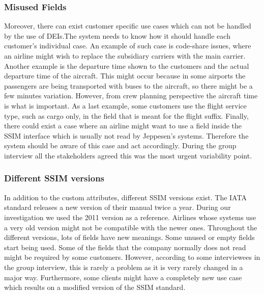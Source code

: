 \subsubsection{Misused Fields }
Moreover, there can exist customer specific use cases which can not be handled by the use of DEIs.The system needs to know how it should handle each customer's individual case.  An example of such case is code-share issues, where an airline might wish to replace the subsidiary  carriers with the main carrier. Another example is the departure time shown to the customers and the actual departure time of the aircraft. This might occur because in some airports the passengers are being transported with buses to the aircraft, so there might be a few minutes variation. However, from crew planning perspective the aircraft time is what is important. As a last example, some customers use the flight service type, such as cargo only, in the field that is meant for the flight suffix. Finally, there could exist a case where an airline might want to use a field inside the SSIM interface which is usually not read by Jeppesen's systems. Therefore the system should be aware of this case and act accordingly. 
During the group interview all the stakeholders agreed this was the most urgent variability point.



\subsubsection{Different SSIM versions}
In addition to the custom attributes, different SSIM versions exist. The IATA standard releases a new version of their manual twice a year. During our investigation we used the 2011 version as a reference. Airlines whose systems use a very old version might not be compatible with the newer ones. Throughout the different versions, lots of fields have new meanings. Some unused or empty fields start being used. Some of the fields that the company normally does not read might be required by some customers. However, according to some interviewees in the group interview, this is  rarely a problem as it is very rarely changed in a major way. Furthermore, some clients might have a completely new use case which results on a modified version of the SSIM standard.    

